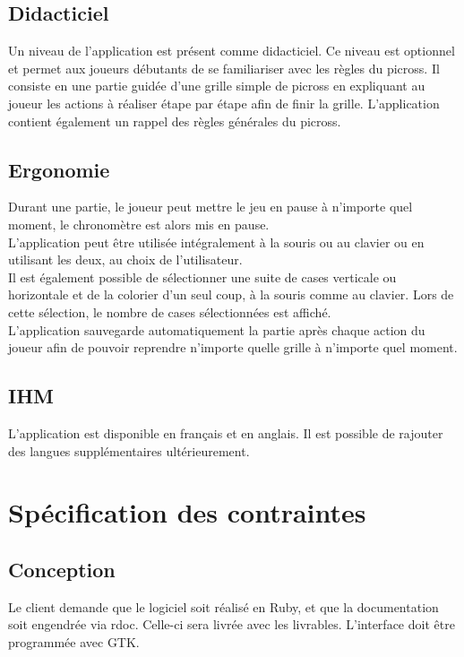 \documentclass{report}
\begin{document}
		\section{Didacticiel}
			Un niveau de l'application est présent comme didacticiel. Ce niveau est optionnel et permet aux joueurs débutants de se familiariser avec les règles du picross. Il consiste en une partie guidée d'une grille simple de picross en expliquant au joueur les actions à réaliser étape par étape afin de finir la grille. L'application contient également un rappel des règles générales du picross.

		\section{Ergonomie}
			Durant une partie, le joueur peut mettre le jeu en pause à n'importe quel moment, le chronomètre est alors mis en pause.\\
     		L'application peut être utilisée intégralement à la souris ou au clavier ou en utilisant les deux, au choix de l'utilisateur.\\
			Il est également possible de sélectionner une suite de cases verticale ou horizontale et de la colorier d'un seul coup, à la souris comme au clavier. Lors de cette sélection, le nombre de cases sélectionnées est affiché.\\
			L'application sauvegarde automatiquement la partie après chaque action du joueur afin de pouvoir reprendre n'importe quelle grille à n'importe quel moment.

			
		\section{IHM}
			L'application est disponible en français et en anglais. Il est possible de rajouter des langues supplémentaires ultérieurement.
			
\chapter{Spécification des contraintes}

	\section{Conception}
		Le client demande que le logiciel soit réalisé en Ruby, et que la documentation soit engendrée via rdoc. Celle-ci sera livrée avec les livrables. L'interface doit être programmée avec GTK.
		
\end{document}
